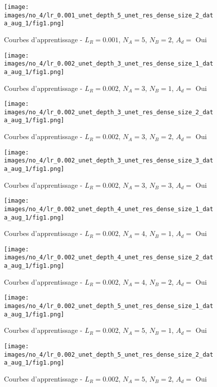     \begin{figure}[H]
        \centering 
        \texttt{[image: images/no\_4/lr\_0.001\_unet\_depth\_5\_unet\_res\_dense\_size\_2\_data\_aug\_1/fig1.png]}
        \caption{Courbes d’apprentissage - \(L_R=0.001\), \(N_A=5\), \(N_B=2\), \(A_d= \) Oui}
    \end{figure}

    \begin{figure}[H]
        \centering 
        \texttt{[image: images/no\_4/lr\_0.002\_unet\_depth\_3\_unet\_res\_dense\_size\_1\_data\_aug\_1/fig1.png]}
        \caption{Courbes d’apprentissage - \(L_R=0.002\), \(N_A=3\), \(N_B=1\), \(A_d= \) Oui}
    \end{figure}
    
    \begin{figure}[H]
        \centering 
        \texttt{[image: images/no\_4/lr\_0.002\_unet\_depth\_3\_unet\_res\_dense\_size\_2\_data\_aug\_1/fig1.png]}
        \caption{Courbes d’apprentissage - \(L_R=0.002\), \(N_A=3\), \(N_B=2\), \(A_d= \) Oui}
    \end{figure}
    
    \begin{figure}[H]
        \centering 
        \texttt{[image: images/no\_4/lr\_0.002\_unet\_depth\_3\_unet\_res\_dense\_size\_3\_data\_aug\_1/fig1.png]}
        \caption{Courbes d’apprentissage - \(L_R=0.002\), \(N_A=3\), \(N_B=3\), \(A_d= \) Oui}
    \end{figure}

    \begin{figure}[H]
        \centering 
        \texttt{[image: images/no\_4/lr\_0.002\_unet\_depth\_4\_unet\_res\_dense\_size\_1\_data\_aug\_1/fig1.png]}
        \caption{Courbes d’apprentissage - \(L_R=0.002\), \(N_A=4\), \(N_B=1\), \(A_d= \) Oui}
    \end{figure}
    
    \begin{figure}[H]
        \centering 
        \texttt{[image: images/no\_4/lr\_0.002\_unet\_depth\_4\_unet\_res\_dense\_size\_2\_data\_aug\_1/fig1.png]}
        \caption{Courbes d’apprentissage - \(L_R=0.002\), \(N_A=4\), \(N_B=2\), \(A_d= \) Oui}
    \end{figure}

    \begin{figure}[H]
        \centering 
        \texttt{[image: images/no\_4/lr\_0.002\_unet\_depth\_5\_unet\_res\_dense\_size\_1\_data\_aug\_1/fig1.png]}
        \caption{Courbes d’apprentissage - \(L_R=0.002\), \(N_A=5\), \(N_B=1\), \(A_d= \) Oui}
    \end{figure}
    
    \begin{figure}[H]
        \centering 
        \texttt{[image: images/no\_4/lr\_0.002\_unet\_depth\_5\_unet\_res\_dense\_size\_2\_data\_aug\_1/fig1.png]}
        \caption{Courbes d’apprentissage - \(L_R=0.002\), \(N_A=5\), \(N_B=2\), \(A_d= \) Oui}
    \end{figure}

